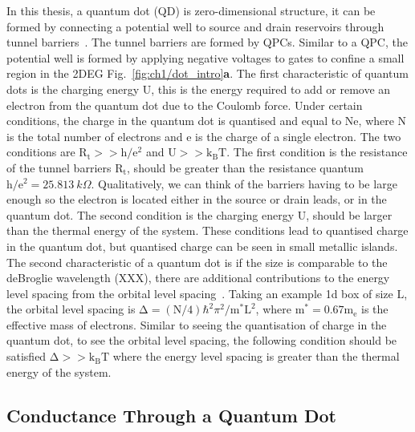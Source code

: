 In this thesis, a quantum dot (QD) is zero-dimensional structure, it can be formed by connecting a potential well to source and drain reservoirs through tunnel barriers~\cite{spins_in_qd}. The tunnel barriers are formed by QPCs. Similar to a QPC, the potential well is formed by applying negative voltages to gates to confine a small region in the 2DEG Fig.~\ref{fig:ch1/dot_intro}\textbf{a}. The first characteristic of quantum dots is the charging energy $\mathrm{U}$, this is the energy required to add or remove an electron from the quantum dot due to the Coulomb force. 
Under certain conditions, the charge in the quantum dot is quantised and equal to $\mathrm{Ne}$, where $\mathrm{N}$ is the total number of electrons and $\mathrm{e}$ is the charge of a single electron. The two conditions are $\mathrm{R_t}>>\mathrm{h/e^2}$ and $\mathrm{U}>>\mathrm{k_BT}$. The first condition is the resistance of the tunnel barriers $\mathrm{R_t}$, should be greater than the resistance quantum $\mathrm{h/e^2}=\qty{25.813}{k\Omega}$. Qualitatively, we can think of the barriers having to be large enough so the electron is located either in the source or drain leads, or in the quantum dot. The second condition is the charging energy $\mathrm{U}$, should be larger than the thermal energy of the system. These conditions lead to quantised charge in the quantum dot, but quantised charge can be seen in small metallic islands. 
The second characteristic of a quantum dot is if the size is comparable to the deBroglie wavelength (XXX), there are additional contributions to the energy level spacing from the orbital level spacing~\cite{Kouwenhoven_1997_electron_transport}. Taking an example 1d box of size $\mathrm{L}$, the orbital level spacing is $\mathrm{\Delta}=(\mathrm{N}/4)\hbar^2\pi^2 / \mathrm{m^*L^2}$, where $\mathrm{m^*}=0.67\mathrm{m_e}$ is the effective mass of electrons. Similar to seeing the quantisation of charge in the quantum dot, to see the orbital level spacing, the following condition should be satisfied $\mathrm{\Delta}>>\mathrm{k_BT}$ where the energy level spacing is greater than the thermal energy of the system. 

\afterpage{\clearpage}
\subsection{Conductance Through a Quantum Dot}

